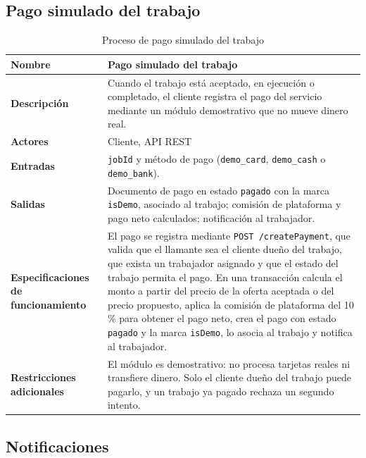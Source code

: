 \documentclass[doc,12pt,a4paper]{apa7}
\begin{document}
\subsection{Pago simulado del trabajo}

\begin{longtable}{|P{3.3cm}|L{11.2cm}|}
\caption{Proceso de pago simulado del trabajo}\\
\hline
\textbf{Nombre} & Pago simulado del trabajo \\ \hline
\textbf{Descripción} & Cuando el trabajo está aceptado, en ejecución o completado, el cliente registra el pago del servicio mediante un módulo demostrativo que no mueve dinero real. \\ \hline
\textbf{Actores} & Cliente, API REST \\ \hline
\textbf{Entradas} & \texttt{jobId} y método de pago (\texttt{demo\_card}, \texttt{demo\_cash} o \texttt{demo\_bank}). \\ \hline
\textbf{Salidas} & Documento de pago en estado \texttt{pagado} con la marca \texttt{isDemo}, asociado al trabajo; comisión de plataforma y pago neto calculados; notificación al trabajador. \\ \hline
\textbf{Especificaciones de funcionamiento} & El pago se registra mediante \texttt{POST /createPayment}, que valida que el llamante sea el cliente dueño del trabajo, que exista un trabajador asignado y que el estado del trabajo permita el pago. En una transacción calcula el monto a partir del precio de la oferta aceptada o del precio propuesto, aplica la comisión de plataforma del 10 \% para obtener el pago neto, crea el pago con estado \texttt{pagado} y la marca \texttt{isDemo}, lo asocia al trabajo y notifica al trabajador. \\ \hline
\textbf{Restricciones adicionales} & El módulo es demostrativo: no procesa tarjetas reales ni transfiere dinero. Solo el cliente dueño del trabajo puede pagarlo, y un trabajo ya pagado rechaza un segundo intento. \\ \hline
\end{longtable}

\subsection{Notificaciones}
\end{document}
